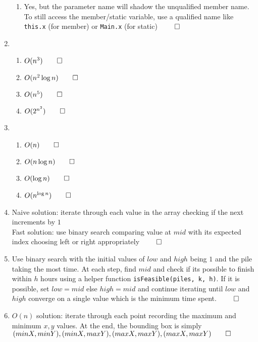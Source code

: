 \documentclass[12pt, a4paper]{article}
\begin{document}
\begin{enumerate}[Q\arabic*.]
\begin{enumerate}[(\alph*.)]
      \item Yes, but the parameter name will shadow the unqualified member name. To still access the member/static variable, use a qualified name like \lstinline|this.x| (for member) or \lstinline|Main.x| (for static) $\qed$
    \end{enumerate}

  \item 
    \begin{enumerate}[(\alph*.)]
      \item $O(n^3) \qed$
      \item $O(n^2 \log n) \qed$
      \item $O(n^5) \qed$
      \item $O(2^{n^2}) \qed$
    \end{enumerate}

  \item 
    \begin{enumerate}[(\alph*.)]
      \item $O(n) \qed$
      \item $O(n\log n) \qed$
      \item $O(\log n) \qed$
      \item $O(n^{\log n}) \qed$
    \end{enumerate}

  \item Naive solution: iterate through each value in the array checking if the next increments by $1$\\
    Fast solution: use binary search comparing value at $mid$ with its expected index choosing left or right appropriately $\qed$

  \item Use binary search with the initial values of $low$ and $high$ being $1$ and the pile taking the most time. At each step, find $mid$ and check if its possible to finish within $h$ hours using a helper function \lstinline|isFeasible(piles, k, h)|. If it is possible, set $low = mid$ else $high = mid$ and continue iterating until $low$ and $high$ converge on a single value which is the minimum time spent. $\qed$

  \item $O(n)$ solution: iterate through each point recording the maximum and minimum $x,y$ values. At the end, the bounding box is simply $(minX, minY), (minX, maxY), (maxX, maxY), (maxX, maxY) \qed$
\end{enumerate}
\end{document}
